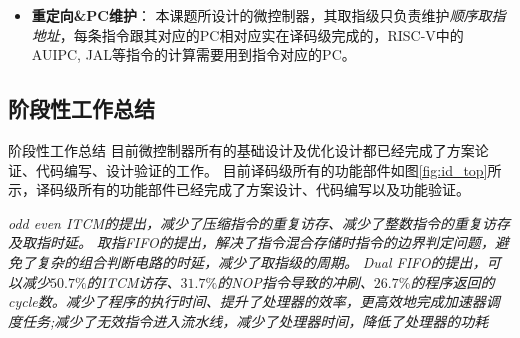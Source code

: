 \documentclass[a4paper, 12pt]{article}
\begin{document}
\begin{itemize}
    \item \textbf{重定向\&PC维护}：
      本课题所设计的微控制器，其取指级只负责维护\textit{顺序取指地址}，每条指令跟其对应的PC相对应实在译码级完成的，RISC-V中的AUIPC, JAL等指令的计算需要用到指令对应的PC。



  \end{itemize}  
\subsection{阶段性工作总结}
阶段性工作总结  
  目前微控制器所有的基础设计及优化设计都已经完成了方案论证、代码编写、设计验证的工作。
  目前译码级所有的功能部件如图\ref{fig:id_top}所示，译码级所有的功能部件已经完成了方案设计、代码编写以及功能验证。

    \textit{odd even ITCM的提出，减少了压缩指令的重复访存、减少了整数指令的重复访存及取指时延。}
    \textit{取指FIFO的提出，解决了指令混合存储时指令的边界判定问题，避免了复杂的组合判断电路的时延，减少了取指级的周期。}
    \textit{Dual FIFO的提出，可以减少$50.7\%$的ITCM访存、$31.7\%$的NOP指令导致的冲刷、$26.7\%$的程序返回的cycle数。减少了程序的执行时间、提升了处理器的效率，更高效地完成加速器调度任务;减少了无效指令进入流水线，减少了处理器时间，降低了处理器的功耗}
\end{document}
